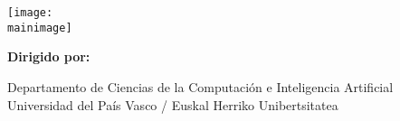 \newcommand{\logofile}{images/logo.png}           %
\newcommand{\mainimage}{images/portada.jpg}       %

\begin{titlepage}
    
    \vspace*{2cm}
    
    \begin{center}
        {\Huge\bfseries \izenburua}  %
        
        \vspace{2cm}
        
        \texttt{[image: \\mainimage]}
        
        \vspace{2cm}
        
        {\Large\textbf{\egilea}}  %
        
        \vspace{1.5cm}
        
        {\large
        \textbf{Dirigido por:}\\[0.5cm]
        \zuzendariak  %
        }
        
        \vfill
        
        {\large \data}  %
        
        \vspace{0.5cm}
        
        {\normalsize 
        Departamento de Ciencias de la Computación e Inteligencia Artificial\\[0.3cm]
        Universidad del País Vasco / Euskal Herriko Unibertsitatea\\[0.3cm]
        \ikasketak
        \ifdef{\espezialitatea}{ -- \espezialitatea}{}
        }
        
    \end{center}
\end{titlepage}
